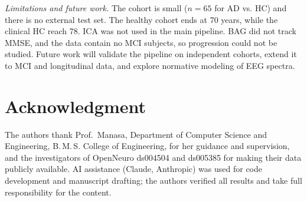\documentclass[conference]{IEEEtran}
\begin{document}
\emph{Limitations and future work.} The cohort is small ($n=65$ for AD vs. HC) and there is no external test set. The healthy cohort ends at 70 years, while the clinical HC reach 78. ICA was not used in the main pipeline. BAG did not track MMSE, and the data contain no MCI subjects, so progression could not be studied. Future work will validate the pipeline on independent cohorts, extend it to MCI and longitudinal data, and explore normative modeling of EEG spectra.

\section*{Acknowledgment}
The authors thank Prof.~Manasa, Department of Computer Science and Engineering, B.\,M.\,S. College of Engineering, for her guidance and supervision, and the investigators of OpenNeuro ds004504 and ds005385 for making their data publicly available. AI assistance (Claude, Anthropic) was used for code development and manuscript drafting; the authors verified all results and take full responsibility for the content.



\end{document}

